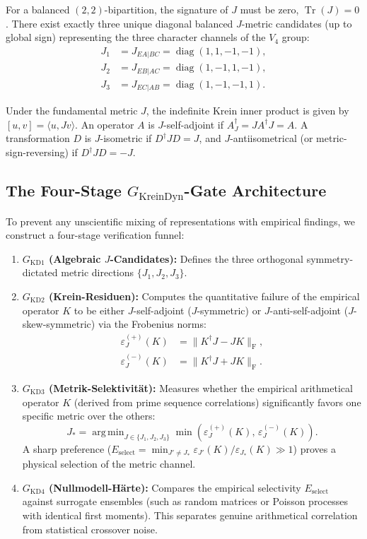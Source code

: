 \documentclass[11pt,a4paper]{article}
\theoremstyle{definition}
\begin{document}
	For a balanced $(2,2)$-bipartition, the signature of $J$ must be zero, $\operatorname{Tr}(J) = 0$. There exist exactly three unique diagonal balanced $J$-metric candidates (up to global sign) representing the three character channels of the $V_4$ group:
	\begin{align}
		J_1 &= J_{EA\vert BC} = \operatorname{diag}(1, 1, -1, -1), \nonumber \\
		J_2 &= J_{EB\vert AC} = \operatorname{diag}(1, -1, 1, -1), \nonumber \\
		J_3 &= J_{EC\vert AB} = \operatorname{diag}(1, -1, -1, 1).
	\end{align}
	
	Under the fundamental metric $J$, the indefinite Krein inner product is given by $[u, v] = \langle u, J v \rangle$. An operator $A$ is $J$-self-adjoint if $A^\dagger_J = J A^\dagger J = A$. A transformation $D$ is $J$-isometric if $D^\dagger J D = J$, and $J$-antiisometrical (or metric-sign-reversing) if $D^\dagger J D = -J$.
	
	\subsection{The Four-Stage $G_{\mathrm{KreinDyn}}$-Gate Architecture}
	To prevent any unscientific mixing of representations with empirical findings, we construct a four-stage verification funnel:
	
	\begin{enumerate}
		\item \textbf{$G_{\mathrm{KD1}}$ (Algebraic $J$-Candidates):} Defines the three orthogonal symmetry-dictated metric directions $\{J_1, J_2, J_3\}$.
		\item \textbf{$G_{\mathrm{KD2}}$ (Krein-Residuen):} Computes the quantitative failure of the empirical operator $K$ to be either $J$-self-adjoint ($J$-symmetric) or $J$-anti-self-adjoint ($J$-skew-symmetric) via the Frobenius norms:
		\begin{align}
			\varepsilon_J^{(+)}(K) &= \|K^\dagger J - J K\|_{\mathrm{F}}, \\
			\varepsilon_J^{(-)}(K) &= \|K^\dagger J + J K\|_{\mathrm{F}}.
		\end{align}
		\item \textbf{$G_{\mathrm{KD3}}$ (Metrik-Selektivität):} Measures whether the empirical arithmetical operator $K$ (derived from prime sequence correlations) significantly favors one specific metric over the others:
		\begin{equation}
			J_* = \operatorname{arg\,min}_{J \in \{J_1, J_2, J_3\}} \min\left(\varepsilon_J^{(+)}(K), \, \varepsilon_J^{(-)}(K)\right).
		\end{equation}
		A sharp preference ($E_{\mathrm{select}} = \min_{J' \neq J_*} \varepsilon_{J'}(K) / \varepsilon_{J_*}(K) \gg 1$) proves a physical selection of the metric channel.
		\item \textbf{$G_{\mathrm{KD4}}$ (Nullmodell-Härte):} Compares the empirical selectivity $E_{\mathrm{select}}$ against surrogate ensembles (such as random matrices or Poisson processes with identical first moments). This separates genuine arithmetical correlation from statistical crossover noise.
	\end{enumerate}
	
\end{document}

